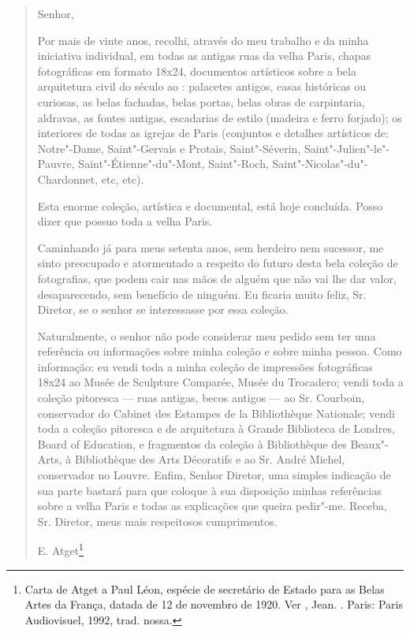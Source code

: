 \begin{quote}
Senhor,

Por mais de vinte anos, recolhi, através do meu trabalho e da minha
iniciativa individual, em todas as antigas ruas da velha Paris, chapas
fotográficas em formato 18x24, documentos artísticos sobre a bela
arquitetura civil do século  ao : palacetes antigos, casas
históricas ou curiosas, as belas fachadas, belas portas, belas obras de
carpintaria, aldravas, as fontes antigas, escadarias de estilo (madeira
e ferro forjado); os interiores de todas as igrejas de Paris (conjuntos
e detalhes artísticos de: Notre"-Dame, Saint"-Gervais e Protais,
Saint"-Séverin, Saint"-Julien"-le"-Pauvre, Saint"-Étienne"-du"-Mont,
Saint"-Roch, Saint"-Nicolas"-du"-Chardonnet, etc, etc).

Esta enorme coleção, artística e documental, está hoje concluída. Posso
dizer que possuo toda a velha Paris.

Caminhando já para meus setenta anos, sem herdeiro nem sucessor, me
sinto preocupado e atormentado a respeito do futuro desta bela coleção
de fotografias, que podem cair nas mãos de alguém que não vai lhe dar
valor, desaparecendo, sem benefício de ninguém. Eu ficaria muito feliz,
Sr. Diretor, se o senhor se interessasse por essa coleção.

Naturalmente, o senhor não pode considerar meu pedido sem ter uma
referência ou informações sobre minha coleção e sobre minha pessoa. Como
informação: eu vendi toda a minha coleção de impressões fotográficas 18x24 ao Musée de Sculpture Comparée, Musée du Trocadero; vendi toda a
coleção pitoresca --- ruas antigas, becos antigos --- ao Sr. Courboin,
conservador do Cabinet des Estampes de la Bibliothèque Nationale; vendi
toda a coleção pitoresca e de arquitetura à Grande Biblioteca de
Londres, Board of Education, e fragmentos da coleção à Bibliothèque des
Beaux"-Arts, à Bibliothèque des Arts Décoratifs e ao Sr. André Michel,
conservador no Louvre. Enfim, Senhor Diretor, uma simples indicação de
sua parte bastará para que coloque à sua disposição minhas referências
sobre a velha Paris e todas as explicações que queira pedir"-me. Receba,
Sr. Diretor, meus mais respeitosos cumprimentos.

\hfill{}E. Atget\footnote{Carta de Atget a Paul Léon, espécie de secretário de
  Estado para as Belas Artes da França, datada de 12 de novembro de
  1920. Ver , Jean. {}. Paris: Paris Audiovisuel, 1992, trad. nossa.}
\end{quote}

